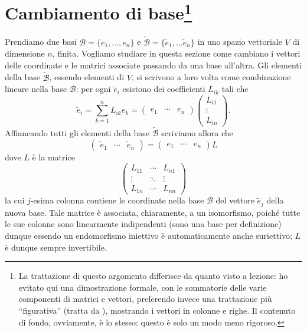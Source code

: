 \section[Cambiamento di base]{Cambiamento di base\footnote{
	La trattazione di questo argomento differisce da quanto visto a lezione: ho evitato qui una dimostrazione formale, con le sommatorie delle varie componenti di matrici e vettori, preferendo invece una trattazione più ``figurativa'' (tratta da \cite{multilinear-algebra}), mostrando i vettori in colonne e righe.
	Il contenuto di fondo, ovviamente, è lo stesso: questo è solo un modo meno rigoroso.
}}
\label{sec:cambiamento-base}
Prendiamo due basi $\mathcal B=\{e_1,\dots,e_n\}$ e $\tilde{\mathcal B}=\{\tilde e_1,\dots\tilde e_n\}$ in uno spazio vettoriale $V$ di dimensione $n$, finita.
Vogliamo studiare in questa sezione come cambiano i vettori delle coordinate e le matrici associate passando da una base all'altra.
Gli elementi della base $\tilde{\mathcal B}$, essendo elementi di $V$, si scrivono a loro volta come combinazione lineare nella base $\mathcal B$: per ogni $\tilde e_i$ esistono dei coefficienti $L_{ik}$ tali che
\begin{equation}
	\tilde e_i=\sum_{k=1}^nL_{ik}e_k=
	\begin{pmatrix}
		e_1&\cdots&e_n
	\end{pmatrix}
	\begin{pmatrix}
		L_{i1}\\
		\vdots\\
		L_{in}
	\end{pmatrix}.
\end{equation}
Affiancando tutti gli elementi della base $\tilde{\mathcal B}$ scriviamo allora che
\begin{equation}
	\begin{pmatrix}
		\tilde e_1&\cdots&\tilde e_n
	\end{pmatrix}
	=
	\begin{pmatrix}
		e_1&\cdots&e_n
	\end{pmatrix}
	L
	\label{eq:trasformazione-base}
\end{equation}
dove $L$ è la matrice
\begin{equation}
	\begin{pmatrix}
		L_{11}&\cdots&L_{n1}\\
		\vdots&\ddots&\vdots\\
		L_{1n}&\cdots&L_{nn}
	\end{pmatrix}
\end{equation}
la cui $j$-esima colonna contiene le coordinate nella base $\mathcal B$ del vettore $\tilde e_j$ della nuova base.
Tale matrice è associata, chiaramente, a un isomorfismo, poich\'e tutte le sue colonne sono linearmente indipendenti (sono una base per definizione) dunque essendo un endomorfismo iniettivo è automaticamente anche suriettivo; $L$ è dunque sempre invertibile.

